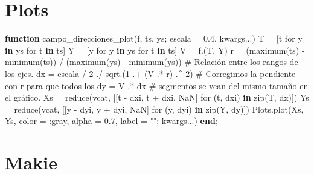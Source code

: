 \documentclass[
  spanish,
  a4paper,
]{scrreport}
\newenvironment{Shaded}{\begin{snugshade}}{\end{snugshade}}
\newcommand{\CommentTok}[1]{\textcolor[rgb]{0.37,0.37,0.37}{#1}}
\newcommand{\ConstantTok}[1]{\textcolor[rgb]{0.56,0.35,0.01}{#1}}
\newcommand{\FloatTok}[1]{\textcolor[rgb]{0.68,0.00,0.00}{#1}}
\newcommand{\FunctionTok}[1]{\textcolor[rgb]{0.28,0.35,0.67}{#1}}
\newcommand{\KeywordTok}[1]{\textcolor[rgb]{0.00,0.23,0.31}{\textbf{#1}}}
\newcommand{\NormalTok}[1]{\textcolor[rgb]{0.00,0.23,0.31}{#1}}
\newcommand{\OperatorTok}[1]{\textcolor[rgb]{0.37,0.37,0.37}{#1}}
\newcommand{\StringTok}[1]{\textcolor[rgb]{0.13,0.47,0.30}{#1}}
\theoremstyle{definition}
\theoremstyle{remark}
\begin{document}
\section{Plots}

\begin{Shaded}
\begin{Highlighting}[]
\KeywordTok{function} \FunctionTok{campo\_direcciones\_plot}\NormalTok{(f, ts, ys; escala }\OperatorTok{=} \FloatTok{0.4}\NormalTok{, kwargs}\OperatorTok{...}\NormalTok{)}
\NormalTok{    T }\OperatorTok{=}\NormalTok{ [t for y }\KeywordTok{in}\NormalTok{ ys for t }\KeywordTok{in}\NormalTok{ ts]}
\NormalTok{    Y }\OperatorTok{=}\NormalTok{ [y for y }\KeywordTok{in}\NormalTok{ ys for t }\KeywordTok{in}\NormalTok{ ts]}
\NormalTok{    V }\OperatorTok{=} \FunctionTok{f}\NormalTok{.(T, Y)}
\NormalTok{    r }\OperatorTok{=}\NormalTok{ (}\FunctionTok{maximum}\NormalTok{(ts) }\OperatorTok{{-}} \FunctionTok{minimum}\NormalTok{(ts)) }\OperatorTok{/}\NormalTok{ (}\FunctionTok{maximum}\NormalTok{(ys) }\OperatorTok{{-}} \FunctionTok{minimum}\NormalTok{(ys))  }\CommentTok{\# Relación entre los rangos de los ejes.}
\NormalTok{    dx }\OperatorTok{=}\NormalTok{ escala }\OperatorTok{/} \FloatTok{2} \OperatorTok{./} \FunctionTok{sqrt}\NormalTok{.(}\FloatTok{1} \OperatorTok{.+}\NormalTok{ (V }\OperatorTok{.*}\NormalTok{ r) }\OperatorTok{.\^{}} \FloatTok{2}\NormalTok{)  }\CommentTok{\# Corregimos la pendiente con r para que todos los}
\NormalTok{    dy }\OperatorTok{=}\NormalTok{ V }\OperatorTok{.*}\NormalTok{ dx                                  }\CommentTok{\# segmentos se vean del mismo tamaño en el gráfico.}
\NormalTok{    Xs }\OperatorTok{=} \FunctionTok{reduce}\NormalTok{(vcat, [[t }\OperatorTok{{-}}\NormalTok{ dxi, t }\OperatorTok{+}\NormalTok{ dxi, }\ConstantTok{NaN}\NormalTok{] for (t, dxi) }\KeywordTok{in} \FunctionTok{zip}\NormalTok{(T, dx)])}
\NormalTok{    Ys }\OperatorTok{=} \FunctionTok{reduce}\NormalTok{(vcat, [[y }\OperatorTok{{-}}\NormalTok{ dyi, y }\OperatorTok{+}\NormalTok{ dyi, }\ConstantTok{NaN}\NormalTok{] for (y, dyi) }\KeywordTok{in} \FunctionTok{zip}\NormalTok{(Y, dy)])}
\NormalTok{    Plots.}\FunctionTok{plot}\NormalTok{(Xs, Ys, color }\OperatorTok{=} \OperatorTok{:}\NormalTok{gray, alpha }\OperatorTok{=} \FloatTok{0.7}\NormalTok{, label }\OperatorTok{=} \StringTok{""}\NormalTok{; kwargs}\OperatorTok{...}\NormalTok{)}
\KeywordTok{end}\NormalTok{;}
\end{Highlighting}
\end{Shaded}

\section{Makie}
\end{document}
